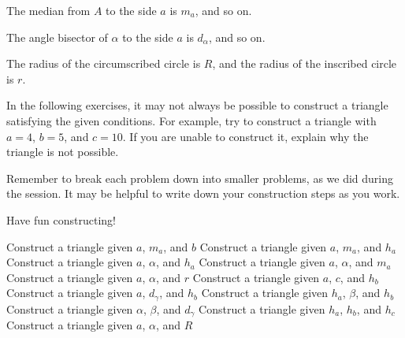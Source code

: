 \documentclass[12pt]{exam}
\begin{document}
The median from \textcolor{xkcdPurple}{$A$} to the side \textcolor{xkcdBrown}{$a$} is \textcolor{xkcdDarkGreen}{$m_a$}, and so on.

The angle bisector of \textcolor{xkcdTeal}{$\alpha$} to the side \textcolor{xkcdBrown}{$a$} is \textcolor{xkcdDarkBlue}{$d_{\alpha}$}, and so on. 

The radius of the circumscribed circle is $R$, and the radius of the inscribed circle is $r$.

In the following exercises, it may not always be possible to construct a triangle satisfying the given conditions. For example, try to construct a triangle with $a=4$, $b=5$, and $c=10$. If you are unable to construct it, explain why the triangle is not possible.

Remember to break each problem down into smaller problems, as we did during the session. It may be helpful to write down your construction steps as you work.

Have fun constructing!


\begin{questions}
    \question Construct a triangle given $a$, $m_a$, and $b$
    \question Construct a triangle given $a$, $m_a$, and $h_a$
    \question Construct a triangle given $a$, $\alpha$, and $h_a$
    \question Construct a triangle given $a$, $\alpha$, and $m_a$
    \question Construct a triangle given $a$, $\alpha$, and $r$
    \question Construct a triangle given $a$, $c$, and $h_b$
    \question Construct a triangle given $a$, $d_{\gamma}$, and $h_b$
    \question Construct a triangle given $h_a$, $\beta$, and $h_b$
    \question Construct a triangle given $\alpha$, $\beta$, and $d_{\gamma}$
    \question Construct a triangle given $h_a$, $h_b$, and $h_c$
    \question Construct a triangle given $a$, $\alpha$, and $R$
\end{questions}
\end{document}
